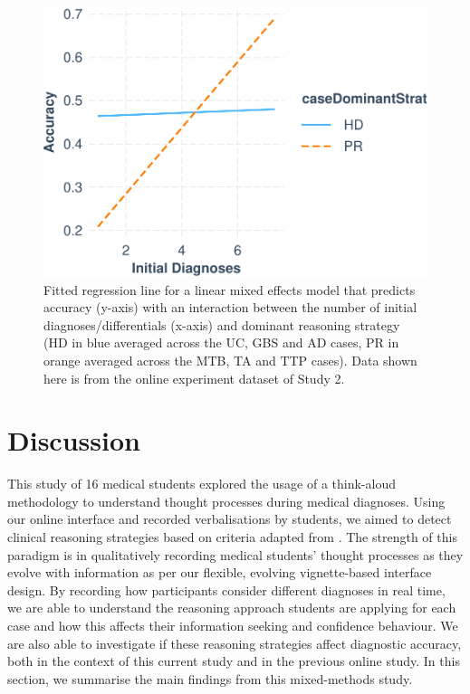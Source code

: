 \documentclass[a4paper, nobind]{templates/ociamthesis}
\begin{document}
\hfill\break

\begin{figure}[H]
\includegraphics{_main_files/figure-latex/accmodelplot-1} \caption[Think-Aloud Study: Initial Differentials and Reasoning Strategy against Accuracy (Regression)]{Fitted regression line for a linear mixed effects model that predicts accuracy (y-axis) with an interaction between the number of initial diagnoses/differentials (x-axis) and dominant reasoning strategy (HD in blue averaged across the UC, GBS and AD cases, PR in orange averaged across the MTB, TA and TTP cases). Data shown here is from the online experiment dataset of Study 2.}\label{fig:accmodelplot}
\end{figure}

\section{Discussion}\label{discussion-2}

This study of 16 medical students explored the usage of a think-aloud methodology to understand thought processes during medical diagnoses. Using our online interface and recorded verbalisations by students, we aimed to detect clinical reasoning strategies based on criteria adapted from \autocite{coderre_diagnostic_2003}. The strength of this paradigm is in qualitatively recording medical students' thought processes as they evolve with information as per our flexible, evolving vignette-based interface design. By recording how participants consider different diagnoses in real time, we are able to understand the reasoning approach students are applying for each case and how this affects their information seeking and confidence behaviour. We are also able to investigate if these reasoning strategies affect diagnostic accuracy, both in the context of this current study and in the previous online study. In this section, we summarise the main findings from this mixed-methods study.
\end{document}
